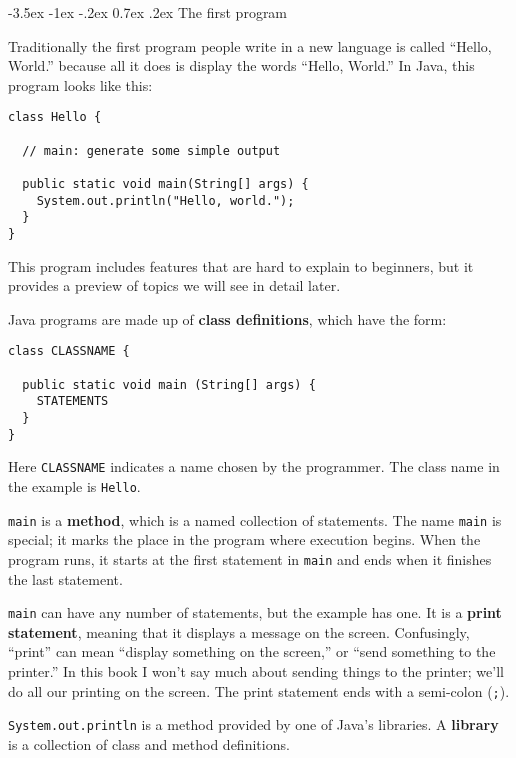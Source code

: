 \documentclass{book}
\makeatletter
\renewcommand{\section}{\@startsection 
    {section} {1} {0mm}%
    {-3.5ex \@plus -1ex \@minus -.2ex}%
    {0.7ex \@plus.2ex}%
    {\normalfont\Large\bfseries}}
\makeatother
\begin{document}
\section{The first program}
\label{hello}

Traditionally the first program people write in a new language
is called ``Hello, World.'' because all it does is display the
words ``Hello, World.''  In Java, this program looks like this:

\begin{verbatim}
class Hello {

  // main: generate some simple output

  public static void main(String[] args) {
    System.out.println("Hello, world.");
  }
}
\end{verbatim}
%
This program includes features that are hard to explain to
beginners, but it provides a preview of topics we
will see in detail later.

Java programs are made up of {\bf class definitions}, which have
the form:


\begin{verbatim}
class CLASSNAME {

  public static void main (String[] args) {
    STATEMENTS
  }
}
\end{verbatim}
%
Here {\tt CLASSNAME} indicates a name chosen by the programmer.
The class name in the example is {\tt Hello}.


{\tt main} is a {\bf method}, which is a named collection of
statements.  The name {\tt main} is special; it marks the place in the
program where execution begins.  When the program runs, it starts at
the first statement in {\tt main} and ends when it finishes the last
statement.


{\tt main} can have any number of statements, but the example has one.
It is a {\bf print statement}, meaning that it displays a message on
the screen.  Confusingly, ``print'' can mean ``display something on
the screen,'' or ``send something to the printer.''  In this book I
won't say much about sending things to the printer; we'll do all our
printing on the screen.  The print statement ends with a semi-colon
({\tt ;}).

{\tt System.out.println} is a method provided by one of Java's
libraries.  A {\bf library} is a collection of class and method
definitions.
\end{document}

